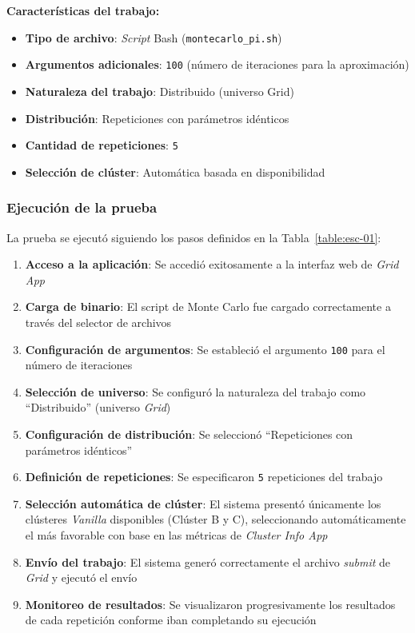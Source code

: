 \textbf{Características del trabajo:}
\begin{itemize}
	\item \textbf{Tipo de archivo}: \textit{Script} Bash (\texttt{montecarlo\_pi.sh})
	\item \textbf{Argumentos adicionales}: \texttt{100} (número de iteraciones para la aproximación)
	\item \textbf{Naturaleza del trabajo}: Distribuido (universo Grid)
	\item \textbf{Distribución}: Repeticiones con parámetros idénticos
	\item \textbf{Cantidad de repeticiones}: \texttt{5}
	\item \textbf{Selección de clúster}: Automática basada en disponibilidad
\end{itemize}

\subsubsection{Ejecución de la prueba}
\noindent

La prueba se ejecutó siguiendo los pasos definidos en la Tabla~\ref{table:esc-01}:

\begin{enumerate}
	\item \textbf{Acceso a la aplicación}: Se accedió exitosamente a la interfaz web de \textit{Grid App}

	\item \textbf{Carga de binario}: El script de Monte Carlo fue cargado correctamente a través del selector de archivos

	\item \textbf{Configuración de argumentos}: Se estableció el argumento \texttt{100} para el número de iteraciones

	\item \textbf{Selección de universo}: Se configuró la naturaleza del trabajo como ``Distribuido'' (universo \textit{Grid})

	\item \textbf{Configuración de distribución}: Se seleccionó ``Repeticiones con parámetros idénticos''

	\item \textbf{Definición de repeticiones}: Se especificaron \texttt{5} repeticiones del trabajo

	\item \textbf{Selección automática de clúster}: El sistema presentó únicamente los clústeres \textit{Vanilla} disponibles (Clúster B y C), seleccionando automáticamente el más favorable con base en las métricas de \textit{Cluster Info App}

	\item \textbf{Envío del trabajo}: El sistema generó correctamente el archivo \textit{submit } de \textit{Grid} y ejecutó el envío

	\item \textbf{Monitoreo de resultados}: Se visualizaron progresivamente los resultados de cada repetición conforme iban completando su ejecución
\end{enumerate}

